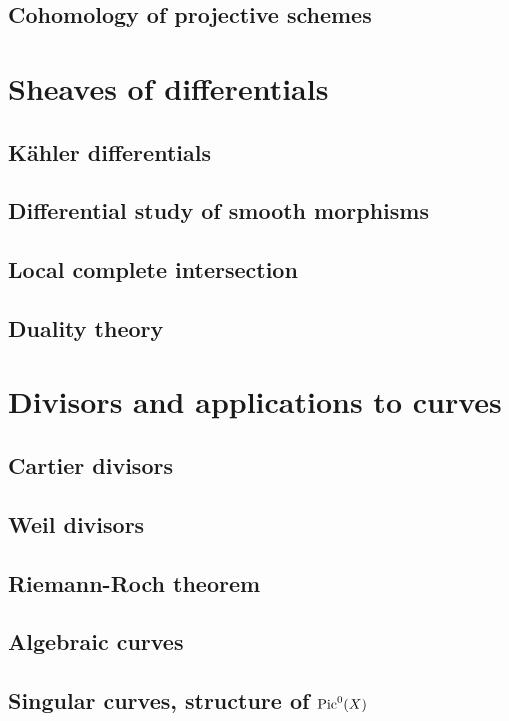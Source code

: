 \documentclass[oneside]{amsbook}
\begin{document}
\section{Cohomology of projective schemes}


\chapter{Sheaves of differentials}
\section{Kähler differentials}

\section{Differential study of smooth morphisms}

\section{Local complete intersection}

\section{Duality theory}


\chapter{Divisors and applications to curves}
\section{Cartier divisors}

\section{Weil divisors}

\section{Riemann-Roch theorem}

\section{Algebraic curves}

\section{Singular curves, structure of $\operatorname{Pic}^0(X)$}

\end{document}
